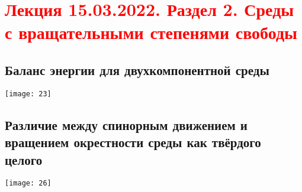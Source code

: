 \documentclass[main.tex]{subfiles}
\begin{document}
\section{\textcolor{red}{Лекция 15.03.2022. Раздел 2. Среды с вращательными степенями свободы}}

\subsection{Баланс энергии для двухкомпонентной среды}
\texttt{[image: 23]}



\subsection{Различие между спинорным движением и вращением окрестности среды как твёрдого целого}
\texttt{[image: 26]}



\end{document}
